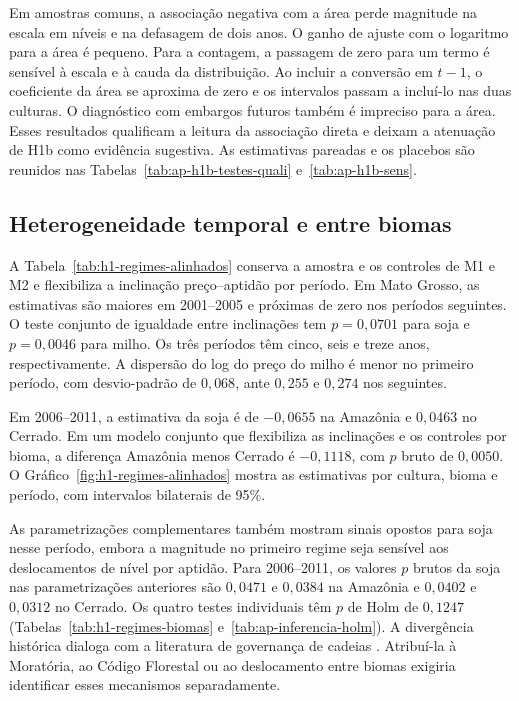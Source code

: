 Em amostras comuns, a associação negativa com a área perde magnitude na escala em níveis e na defasagem de dois anos. O ganho de ajuste com o logaritmo para a área é pequeno. Para a contagem, a passagem de zero para um termo é sensível à escala e à cauda da distribuição. Ao incluir a conversão em $t-1$, o coeficiente da área se aproxima de zero e os intervalos passam a incluí-lo nas duas culturas. O diagnóstico com embargos futuros também é impreciso para a área. Esses resultados qualificam a leitura da associação direta e deixam a atenuação de H1b como evidência sugestiva. As estimativas pareadas e os placebos são reunidos nas Tabelas~\ref{tab:ap-h1b-testes-quali} e~\ref{tab:ap-h1b-sens}.

\subsection{Heterogeneidade temporal e entre biomas}
\label{discussao-regimes}

A Tabela~\ref{tab:h1-regimes-alinhados} conserva a amostra e os controles de M1 e M2 e flexibiliza a inclinação preço--aptidão por período. Em Mato Grosso, as estimativas são maiores em 2001--2005 e próximas de zero nos períodos seguintes. O teste conjunto de igualdade entre inclinações tem $p=0{,}0701$ para soja e $p=0{,}0046$ para milho. Os três períodos têm cinco, seis e treze anos, respectivamente. A dispersão do log do preço do milho é menor no primeiro período, com desvio-padrão de $0{,}068$, ante $0{,}255$ e $0{,}274$ nos seguintes.


\FloatBarrier

Em 2006--2011, a estimativa da soja é de $-0{,}0655$ na Amazônia e $0{,}0463$ no Cerrado. Em um modelo conjunto que flexibiliza as inclinações e os controles por bioma, a diferença Amazônia menos Cerrado é $-0{,}1118$, com $p$ bruto de $0{,}0050$. O Gráfico~\ref{fig:h1-regimes-alinhados} mostra as estimativas por cultura, bioma e período, com intervalos bilaterais de 95\%.

As parametrizações complementares também mostram sinais opostos para soja nesse período, embora a magnitude no primeiro regime seja sensível aos deslocamentos de nível por aptidão. Para 2006--2011, os valores $p$ brutos da soja nas parametrizações anteriores são $0{,}0471$ e $0{,}0384$ na Amazônia e $0{,}0402$ e $0{,}0312$ no Cerrado. Os quatro testes individuais têm $p$ de Holm de $0{,}1247$ (Tabelas~\ref{tab:h1-regimes-biomas} e~\ref{tab:ap-inferencia-holm}). A divergência histórica dialoga com a literatura de governança de cadeias \cite{HeilmayrEtAl2020, HardingEtAl2021}. Atribuí-la à Moratória, ao Código Florestal ou ao deslocamento entre biomas exigiria identificar esses mecanismos separadamente.

